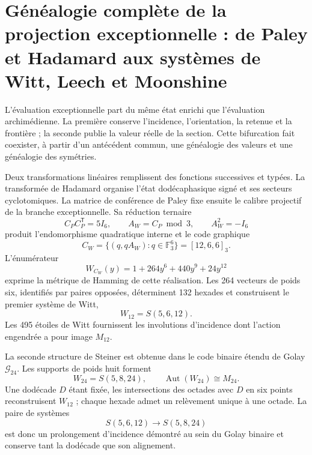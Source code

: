 \section{Généalogie complète de la projection exceptionnelle : de Paley et
Hadamard aux systèmes de Witt, Leech et Moonshine}
\label{sec:genealogia-excepcional-completa-autonoma}

L'évaluation exceptionnelle part du même état enrichi que
l'évaluation archimédienne. La première conserve l'incidence, l'orientation,
la retenue et la frontière ; la seconde publie la valeur réelle de la section. Cette
bifurcation fait coexister, à partir d'un antécédent commun, une généalogie des
valeurs et une généalogie des symétries.

Deux transformations linéaires remplissent des fonctions successives et typées. La
transformée de Hadamard organise l'état dodécaphasique signé et ses
secteurs cyclotomiques. La matrice de conférence de Paley fixe ensuite le
calibre projectif de la branche exceptionnelle. Sa réduction ternaire
\[
 C_P C_P^{\mathsf T}=5I_6,
 \qquad
 A_W=C_P\bmod3,
 \qquad
 A_W^2=-I_6
\]
produit l'endomorphisme quadratique interne et le code graphique
\[
 C_W=\{(q,qA_W):q\in\mathbb F_3^6\}
      =[12,6,6]_3.
\]
L'énumérateur
\[
 W_{C_W}(y)=1+264y^6+440y^9+24y^{12}
\]
exprime la métrique de Hamming de cette réalisation. Les 264 vecteurs de poids
six, identifiés par paires opposées, déterminent 132 hexades et construisent
le premier système de Witt,
\[
 W_{12}=S(5,6,12).
\]
Les 495 étoiles de Witt fournissent les involutions d'incidence dont
l'action engendrée a pour image \(M_{12}\).

La seconde structure de Steiner est obtenue dans le code binaire étendu
de Golay \(\mathcal G_{24}\). Les supports de poids huit forment
\[
 W_{24}=S(5,8,24),
 \qquad \operatorname{Aut}(W_{24})\cong M_{24}.
\]
Une dodécade \(D\) étant fixée, les intersections des octades avec \(D\) en
six points reconstruisent \(W_{12}\) ; chaque hexade admet un relèvement unique
à une octade. La paire de systèmes
\[
 S(5,6,12)\longrightarrow S(5,8,24)
\]
est donc un prolongement d'incidence démontré au sein du Golay
binaire et conserve tant la dodécade que son alignement.

